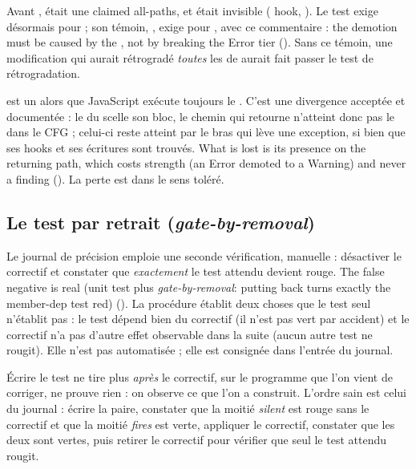 Avant ,  était une \Error{} \og claimed all-paths\fg{}, et  était invisible ( hook, \fg{}). Le test  exige désormais  pour  ; son témoin, , exige  pour , avec ce commentaire : \og the demotion must be caused by the , not by breaking the Error tier\fg{} (). Sans ce témoin, une modification qui aurait rétrogradé \emph{toutes} les \Error{} de  aurait fait passer le test de rétrogradation.

\begin{remarque}
 est un \Warning{} alors que JavaScript exécute toujours le . C'est une divergence acceptée et documentée : le  du  scelle son bloc, le chemin qui retourne n'atteint donc pas le  dans le CFG ; celui-ci reste atteint par le bras qui lève une exception, si bien que ses hooks et ses écritures sont trouvés. \og What is lost is its presence on the returning path, which costs  strength (an Error demoted to a Warning) and never a finding\fg{} (). La perte est dans le sens toléré.
\end{remarque}

\subsection{Le test par retrait (\emph{gate-by-removal})}

Le journal de précision emploie une seconde vérification, manuelle : désactiver le correctif et constater que \emph{exactement} le test attendu devient rouge. \og The false negative is real (unit test plus \emph{gate-by-removal}: putting  back turns exactly the member-dep test red)\fg{} (). La procédure établit deux choses que le test seul n'établit pas : le test dépend bien du correctif (il n'est pas vert par accident) et le correctif n'a pas d'autre effet observable dans la suite (aucun autre test ne rougit). Elle n'est pas automatisée ; elle est consignée dans l'entrée du journal.

\begin{piege}
Écrire le test \og ne tire plus\fg{} \emph{après} le correctif, sur le programme que l'on vient de corriger, ne prouve rien : on observe ce que l'on a construit. L'ordre sain est celui du journal : écrire la paire, constater que la moitié \emph{silent} est rouge sans le correctif et que la moitié \emph{fires} est verte, appliquer le correctif, constater que les deux sont vertes, puis retirer le correctif pour vérifier que seul le test attendu rougit.
\end{piege}

